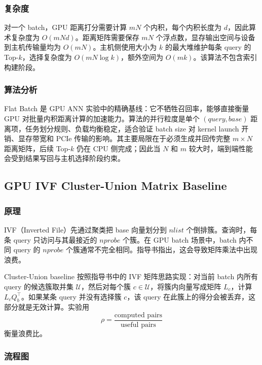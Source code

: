 \documentclass[a4paper]{article}
\newcommand{\bigO}[1]{O\!\left(#1\right)}
\begin{document}
\subsubsection{复杂度}

对一个 batch，GPU 距离打分需要计算 $mN$ 个内积，每个内积长度为 $d$，因此算术复杂度为 $\bigO{mNd}$。距离矩阵需要保存 $mN$ 个浮点数，显存输出空间与设备到主机传输量均为 $\bigO{mN}$。主机侧使用大小为 $k$ 的最大堆维护每条 query 的 Top-$k$，选择复杂度为 $\bigO{mN\log k}$，额外空间为 $\bigO{mk}$。该算法不包含索引构建阶段。

\subsubsection{算法分析}

Flat Batch 是 GPU ANN 实验中的精确基线：它不牺牲召回率，能够直接衡量 GPU 对批量内积距离计算的加速能力。算法的并行粒度是单个 $(query,base)$ 距离项，任务划分规则、负载均衡稳定，适合验证 batch size 对 kernel launch 开销、显存带宽和 PCIe 传输的影响。其主要局限在于必须生成并回传完整 $m\times N$ 距离矩阵，后续 Top-$k$ 仍在 CPU 侧完成；因此当 $N$ 和 $m$ 较大时，端到端性能会受到结果写回与主机选择阶段约束。

\subsection{GPU IVF Cluster-Union Matrix Baseline}

\subsubsection{原理}

IVF（Inverted File）先通过聚类把 base 向量划分到 $nlist$ 个倒排簇。查询时，每条 query 只访问与其最接近的 $nprobe$ 个簇。在 GPU batch 场景中，batch 内不同 query 的 $nprobe$ 个簇通常不完全相同。指导书指出，这会导致矩阵乘法中出现浪费。

Cluster-Union baseline 按照指导书中的 IVF 矩阵思路实现：对当前 batch 内所有 query 的候选簇取并集 $\mathcal{U}$，然后对每个簇 $c\in\mathcal{U}$，将簇内向量写成矩阵 $L_c$，计算 $L_c Q_b^\top$。如果某条 query 并没有选择簇 $c$，该 query 在此簇上的得分会被丢弃，这部分就是无效计算。实验用
\[
  \rho=\frac{\text{computed pairs}}{\text{useful pairs}}
\]
衡量浪费比。

\subsubsection{流程图}
\end{document}
